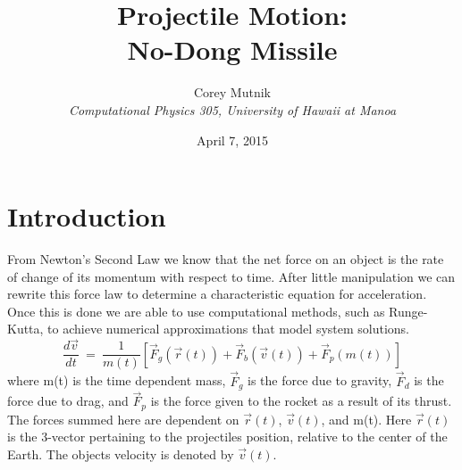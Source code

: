 \documentclass[11pt]{article}
\begin{document}
\pagestyle{myheadings}


\title{Projectile Motion:\\
No-Dong Missile}


\author{Corey Mutnik \\
{\it Computational Physics 305, University of Hawaii at Manoa} }


\date{April 7, 2015}

\maketitle   





\section{Introduction}
From Newton's Second Law we know that the net force on an object is the rate of change of its 
momentum with respect to time.  After little manipulation we can rewrite this force law to 
determine a characteristic equation for acceleration.  Once this is done we are able to use 
computational methods, such as Runge-Kutta, to achieve numerical approximations that model system 
solutions.  
\begin{equation}
\label{acceleration}
\frac{d\vec{v}}{dt} ~=~ \frac{1}{m(t)}
                            \left [ \vec{F}_g(\vec{r}(t)) + 
                            \vec{F}_b(\vec{v}(t)) + 
                            \vec{F}_p(m(t)) \right ]
\end{equation}
where m(t) is the time dependent mass, $\vec F_{g}$ is the force due to gravity, $\vec F_{d}$ is 
the force due to drag, and $\vec F_{p}$ is the force given to the rocket as a result of its 
thrust.  The forces summed here are dependent on $\vec{r}(t)$, $\vec{v}(t)$, and m(t).  Here $\vec{r}(t)$ 
is the 3-vector pertaining to the projectiles position, relative to the center of the Earth.  The objects 
velocity is denoted by $\vec{v}(t)$.
\end{document}
